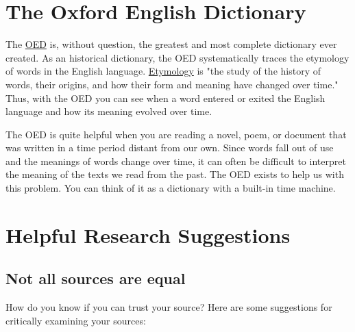 \section{The Oxford English Dictionary}

The \href{http://www.oed.com/}{OED} is, without question, the  greatest and most
complete dictionary ever created. As an historical dictionary, the OED systematically traces the  etymology of words in the English language.  \href{http://en.wikipedia.org/wiki/Etymology}{Etymology} is
"the study of the history of words, their origins, and how their form and
meaning have  changed over time." Thus, with the OED you can see when a word
entered or exited the English language and how its meaning evolved over time.

The OED is quite helpful when you are reading a novel, poem, or document that
was written in a time period distant from our own. Since words fall out of use
and the meanings of words change over time, it can often be difficult to
interpret the meaning of the texts we read from the past. The OED exists to
help us with this problem. You can think of it as a dictionary with a built-in
time machine.

\section{Helpful Research Suggestions}

\subsection{Not all sources are equal}

How do you know if you can trust your source? Here are some suggestions for
critically examining your sources:

